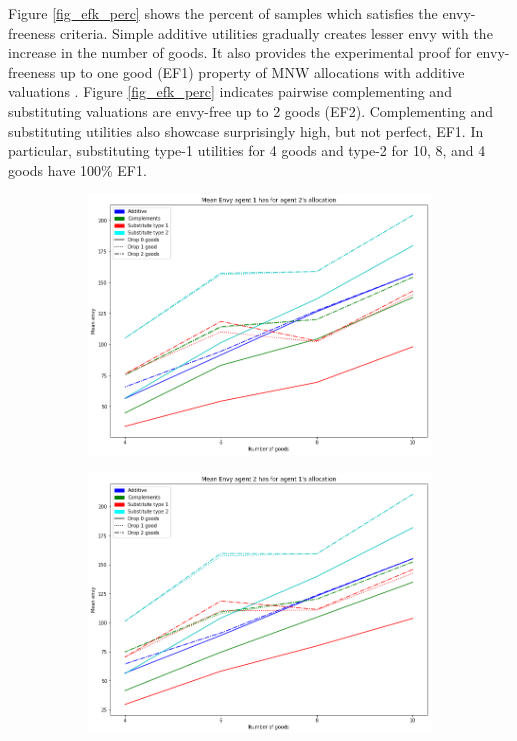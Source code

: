Figure \ref{fig_efk_perc} shows the percent of samples which satisfies the envy-freeness criteria. Simple additive utilities gradually creates lesser envy with the increase in the number of goods. It also provides the experimental proof for envy-freeness up to one good (EF1) property of MNW allocations with additive valuations \cite{caragiannis2016unreasonable}. Figure \ref{fig_efk_perc} indicates pairwise complementing and substituting valuations are envy-free up to 2 goods (EF2). Complementing and substituting utilities also showcase surprisingly high, but not perfect, EF1. In particular, substituting type-1 utilities for 4 goods and type-2 for 10, 8, and 4 goods have 100\% EF1.


\begin{figure}[h!]
  \centering
  \begin{subfigure}[b]{\linewidth}
    \includegraphics[width=\linewidth]{images/mean1_2.png}
    \caption{}
  \end{subfigure}
  \begin{subfigure}[b]{\linewidth}
    \includegraphics[width=\linewidth]{images/mean2_1.png}

\end{subfigure}
\end{figure}
